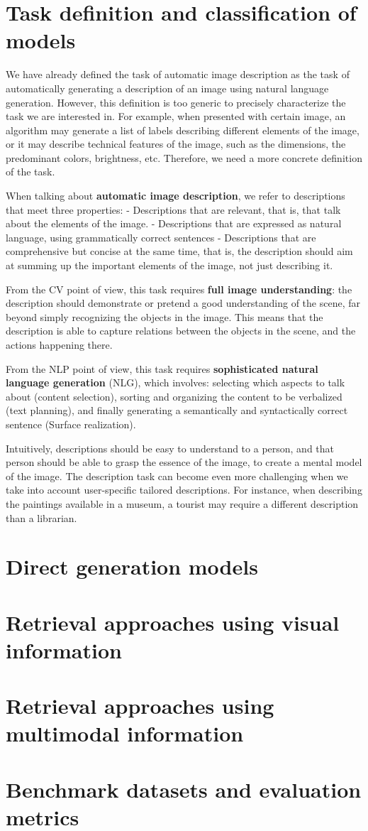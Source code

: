 \section{Task definition and classification of models}

We have already defined the task of automatic image description as the task of automatically generating a description of an image using natural language generation. However, this definition is too generic to precisely characterize the task we are interested in. For example, when presented with certain image, an algorithm may generate a list of labels describing different elements of the image, or it may describe technical features of the image, such as the dimensions, the predominant colors, brightness, etc. Therefore, we need a more concrete definition of the task.

When talking about \textbf{automatic image description}, we refer to descriptions that meet three properties:
- Descriptions that are relevant, that is, that talk about the elements of the image.
- Descriptions that are expressed as natural language, using grammatically correct sentences
- Descriptions that are comprehensive but concise at the same time, that is, the description should aim at summing up the important elements of the image, not just describing it.

From the CV point of view, this task requires \textbf{full image understanding}: the description should demonstrate or pretend a good understanding of the scene, far beyond simply recognizing the objects in the image. This means that the description is able to capture relations between the objects in the scene, and the actions happening there.

From the NLP point of view, this task requires \textbf{sophisticated natural language generation} (NLG), which involves: selecting which aspects to talk about (content selection), sorting and organizing the content to be verbalized (text planning), and finally generating a semantically and syntactically correct sentence (Surface realization).

Intuitively, descriptions should be easy to understand to a person, and that person should be able to grasp the essence of the image, to create a mental model of the image. The description task can become even more challenging when we take into account user-specific tailored descriptions. For instance, when describing the paintings available in a museum, a  tourist may require a different description than a librarian.

\section{Direct generation models}

\section{Retrieval approaches using visual information}

\section{Retrieval approaches using multimodal information}

\section{Benchmark datasets and evaluation metrics}